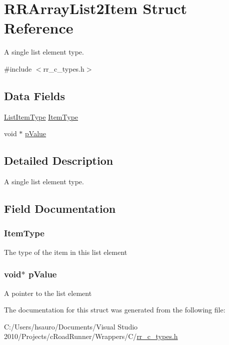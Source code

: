 \hypertarget{struct_r_r_array_list2_item}{
\section{\-R\-R\-Array\-List2\-Item \-Struct \-Reference}
\label{struct_r_r_array_list2_item}
}


\-A single list element type.  




{\ttfamily \#include $<$rr\-\_\-c\-\_\-types.\-h$>$}

\subsection*{\-Data \-Fields}
\begin{DoxyCompactItemize}
\item 
\hyperlink{rr__c__types_8h_ab99437ab2e88aa90b7ebb8add042b25e}{\-List\-Item\-Type} \hyperlink{struct_r_r_array_list2_item_af69273b36c37b84e5c91a0c9d1af3a15}{\-Item\-Type}
\item 
void $\ast$ \hyperlink{struct_r_r_array_list2_item_a63ad54c993b6ca0d76f718dc1a1164c3}{p\-Value}
\end{DoxyCompactItemize}


\subsection{\-Detailed \-Description}
\-A single list element type. 

\subsection{\-Field \-Documentation}
\hypertarget{struct_r_r_array_list2_item_af69273b36c37b84e5c91a0c9d1af3a15}{
\subsubsection[{\-Item\-Type}]{ {\bf \-Item\-Type}}}
\label{struct_r_r_array_list2_item_af69273b36c37b84e5c91a0c9d1af3a15}
\-The type of the item in this list element \hypertarget{struct_r_r_array_list2_item_a63ad54c993b6ca0d76f718dc1a1164c3}{
\subsubsection[{p\-Value}]{\setlength{\rightskip}{0pt plus 5cm}void$\ast$ {\bf p\-Value}}}
\label{struct_r_r_array_list2_item_a63ad54c993b6ca0d76f718dc1a1164c3}
\-A pointer to the list element 

\-The documentation for this struct was generated from the following file\-:\begin{DoxyCompactItemize}
\item 
\-C\-:/\-Users/hsauro/\-Documents/\-Visual Studio 2010/\-Projects/c\-Road\-Runner/\-Wrappers/\-C/\hyperlink{rr__c__types_8h}{rr\-\_\-c\-\_\-types.\-h}\end{DoxyCompactItemize}
